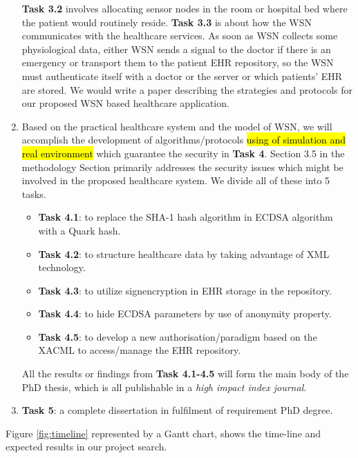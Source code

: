 \documentclass[a4paper,11pt]{article}
\DeclareRobustCommand{\hlyellow}[1]{{\sethlcolor{white}\hl{#1}}}
\begin{document}
\begin{enumerate}
\textbf{Task 3.2} involves allocating sensor nodes in the room or hospital bed where the patient would routinely reside. \textbf{Task 3.3} is about how the WSN communicates with the healthcare services. As soon as WSN collects some physiological data, either WSN sends a signal to the doctor if there is an emergency or transport them to the patient EHR repository, so the WSN must authenticate itself with a doctor or the server or which patients' EHR are stored. We would write a paper describing the strategies and protocols for our proposed WSN based healthcare application.

\item Based on the practical healthcare system and the model of WSN, we will accomplish the development of algorithms/protocols \hlyellow{using of simulation and real environment} which guarantee the security in \textbf{Task 4}. Section 3.5 in the methodology Section primarily addresses the security issues which might be involved in the proposed healthcare system. We divide all of these into 5 tasks.

  \begin{itemize}
           \item \textbf{Task 4.1}: to replace the SHA-1 hash algorithm in ECDSA algorithm with a Quark hash.
           \item \textbf{Task 4.2}: to structure healthcare data by taking advantage of XML technology.
           \item \textbf{Task 4.3}: to utilize signencryption in EHR storage in the repository.
           \item \textbf{Task 4.4}: to hide ECDSA parameters by use of anonymity property.
           \item \textbf{Task 4.5}: to develop a new authorisation/paradigm based on the XACML to access/manage the EHR repository.
     \end{itemize}
All the results or findings from \textbf{Task 4.1-4.5} will form the main body of the PhD thesis, which is all publishable in a \emph{high impact index journal}.

\item \textbf{Task 5}: a complete dissertation in fulfilment of requirement PhD degree. 
\end{enumerate}

Figure \ref{fig:timeline} represented by a Gantt chart, shows the time-line and expected results in our project search.
\end{document}
